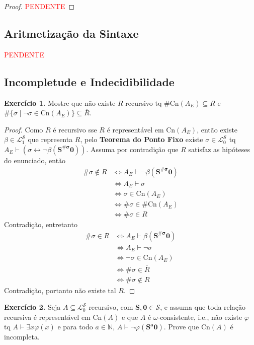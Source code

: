 \documentclass[11pt]{article}
\newcommand{\mc}[1]{\mathcal{#1}}
\newcommand{\mbb}[1]{\mathbb{#1}}
\newcommand{\subs}[2]{
    \setcounter{subsection}{#1 - 1}
    \subsection{#2}
    }
\begin{document}
\begin{proof}
    \textcolor{red}{PENDENTE}
\end{proof}

\subs{4}{Aritmetização da Sintaxe}

\textcolor{red}{PENDENTE}

\subs{5}{Incompletude e Indecidibilidade}

\begin{shaded}
\textbf{Exercício 1.} Mostre que não existe $R$ recursivo tq $\#\text{Cn}(A_E)\subseteq R$ e $\#\{\sigma\mid\neg\sigma\in\text{Cn}(A_E)\}\subseteq\overline{R}$.
\end{shaded}

\begin{proof}
    Como $R$ é recursivo sse $R$ é representável em $\text{Cn}(A_E)$, então existe $\beta\in\mc{L}_1^\mc{S}$ que representa $R$, pelo \textbf{Teorema do Ponto Fixo} existe $\sigma\in\mc{L}_0^\mc{S}$ tq $A_E\vdash(\sigma\leftrightarrow\neg\beta(\mathbf{S^{\#\sigma}0}))$. Assuma por contradição que $R$ satisfaz as hipóteses do enunciado, então
    \begin{align*}
        \#\sigma\notin R & \Leftrightarrow A_E\vdash\neg\beta(\mathbf{S^{\#\sigma}0})\\
        & \Leftrightarrow A_E\vdash\sigma\\
        & \Leftrightarrow \sigma\in\text{Cn}(A_E)\\
        & \Leftrightarrow \#\sigma\in\#\text{Cn}(A_E)\\
        & \Leftrightarrow \#\sigma\in R
    \end{align*}
    Contradição, entretanto
    \begin{align*}
        \#\sigma\in R & \Leftrightarrow A_E\vdash\beta(\mathbf{S^{\#\sigma}0})\\
        & \Leftrightarrow A_E\vdash\neg\sigma\\
        & \Leftrightarrow \neg\sigma\in\text{Cn}(A_E)\\
        & \Leftrightarrow \#\sigma\in\overline{R}\\
        & \Leftrightarrow \#\sigma\notin R
    \end{align*}
    Contradição, portanto não existe tal $R$.
\end{proof}

\begin{shaded}
\textbf{Exercício 2.} Seja $A\subseteq\mc{L}_0^\mc{S}$ recursivo, com $\mathbf{S},\mathbf{0}\in\mc{S}$, e assuma que toda relação recursiva é representável em $\text{Cn}(A)$ e que $A$ é $\omega$-consistente, i.e., não existe $\varphi$ tq $A\vdash\exists x\varphi(x)$ e para todo $a\in\mbb{N}$, $A\vdash\neg\varphi(\mathbf{S^a0})$. Prove que $\text{Cn}(A)$ é incompleta.
\end{shaded}
\end{document}
